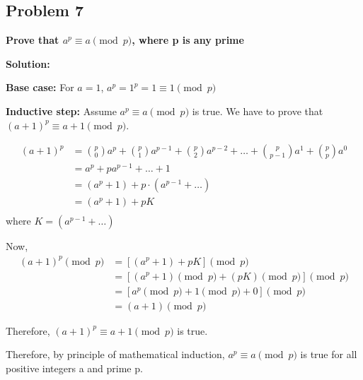 \subsection{Problem 7}
\textbf{Prove that $a^p \equiv a \pmod{p}$, where p is any prime}
\par

\begin{flushleft}
\textbf{Solution: }
\par
\textbf{Base case:} For $a = 1$, $a^p = 1^p = 1 \equiv 1 \pmod{p}$\\
\par
\textbf{Inductive step:} Assume $a^p \equiv a \pmod{p}$ is true. We have to prove that $(a+1)^p \equiv a+1 \pmod{p}$.\\ 
\par
$$
\begin{aligned}
    (a+1) ^ p & = \binom{p}{0} a^p + \binom{p}{1} a^{p-1} + \binom{p}{2} a^{p-2} + \dots + \binom{p}{p-1} a^1 + \binom{p}{p} a^0 \\
    & = a^p + pa^{p-1} + \dots + 1 \\
    & = (a^p+1) + p \cdot (a^{p-1}+\dots)  \\
    & = (a^p+1) + pK \\
\end{aligned}
$$
where $K = (a^{p-1}+\dots) $
\par 
Now, 
$$
\begin{aligned}
    (a+1)^p \pmod{p} & = [(a^p+1) + pK] \pmod{p} \\
    & = [ (a^p+1) \pmod{p} + (pK) \pmod{p} ] \pmod{p} \\
    & = [ a^p \pmod{p} + 1 \pmod{p} + 0 ] \pmod{p} \\
    & = (a + 1) \pmod{p}
\end{aligned}
$$
\par
Therefore, $(a+1)^p \equiv a+1 \pmod{p}$ is true.\\
\par
Therefore, by principle of mathematical induction, $a^p \equiv a \pmod{p}$ is true for all positive integers a and prime p.

\end{flushleft}